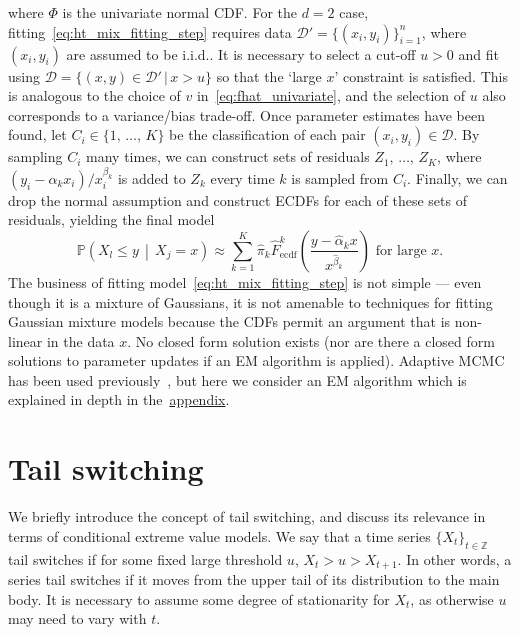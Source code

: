 \documentclass[11pt,twoside,openany]{book}
\newcommand{\prob}{\mathbb{P}}
\newcommand{\D}{\mathcal{D}}
\numberwithin{Theorem}{chapter}
\numberwithin{Definition}{chapter}
\numberwithin{Lemma}{chapter}
\numberwithin{Algorithm}{chapter}
\numberwithin{equation}{chapter}
\begin{document}
where $\Phi$ is the univariate normal CDF. For the $d=2$ case,
fitting~\eqref{eq:ht_mix_fitting_step} requires data $\D' =
\{(x_i,y_i)\}_{i=1}^n$, where $(x_i , y_i)$ are assumed to be i.i.d.. It is
necessary to select a cut-off $u>0$ and fit using $\D = \{(x,y)\in \D' \,|\, x
> u\}$ so that the `large $x$' constraint is satisfied. This is analogous to
the choice of $v$ in~\eqref{eq:fhat_univariate}, and the selection of $u$ also
corresponds to a variance/bias trade-off. Once parameter estimates have been
found, let $C_i\in\{1,\,\ldots,\,K\}$ be the classification of each pair
$(x_i,y_i)\in\D$. By sampling $C_i$ many times, we can construct sets of
residuals $Z_1,\,\ldots,\,Z_K$, where $(y_i - \alpha_k x_i)/x_i^{\beta_k}$ is
added to $Z_k$ every time $k$ is sampled from $C_i$. Finally, we can drop the
normal assumption and construct ECDFs for each of these sets of
residuals, yielding the final model
\begin{equation}\label{eq:ht_mix_final}
\prob\left(X_{l}\leq y\,\middle|\, X_j = x\right) \approx
\sum_{k=1}^K\hat\pi_k \hat F^k_{\text{ecdf}}\left(\frac{y - \hat\alpha_k
x}{x^{\hat\beta_k}}\right) \text{ for large }x.
\end{equation}
The business of fitting model~\eqref{eq:ht_mix_fitting_step} is not simple ---
even though it is a mixture of Gaussians, it is not amenable to techniques for
fitting Gaussian mixture models because the CDFs permit an argument that
is non-linear in the data $x$.
No closed form solution exists (nor are there a closed form solutions to
parameter updates if an EM algorithm is applied). Adaptive MCMC has been used
previously~\citep{tendijck2021modeling}, but here we consider an EM algorithm
which is explained in depth in
the~\hyperref[appendix:htnormalem]{appendix}.

\section{Tail switching}

We briefly introduce the concept of tail switching, and discuss its relevance in
terms of conditional extreme value models.
We say that a time series $\{X_t\}_{t\in \mathbb{Z}}$ tail
switches if
for some fixed large threshold $u$,
$X_{t} > u > X_{t+1}$. In other words, a series tail switches if it moves from
the upper tail of its distribution to the main body. It is necessary to assume
some degree of stationarity for
$X_t$, as otherwise $u$ may need to vary with $t$.
\end{document}
